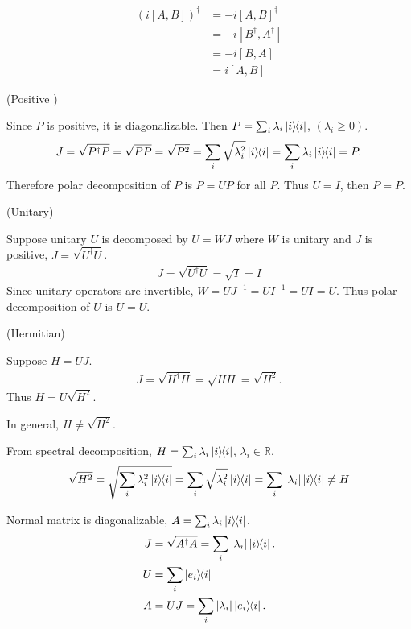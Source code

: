 \begin{align*}
	\left(i \left[A, B\right] \right)^\dagger &= -i \left[A, B\right]^\dagger\\
		&= -i \left[B^\dagger, A^\dagger \right]\\
		&= -i \left[B, A \right]\\
		&= i \left[A, B\right]
\end{align*}


(Positive )

 Since $P$ is positive, it is diagonalizable. Then $P = \sum_i \lambda_i \ket{i}\hspace{-1mm} \bra{i}$, $(\lambda_i \geq 0)$.
\begin{align*}
	J = \sqrt{P^\dagger P} = \sqrt{P P} = \sqrt{P^2} = \sum_i \sqrt{\lambda_i^2} \ket{i}\hspace{-1mm} \bra{i} = \sum_i \lambda_i \ket{i}\hspace{-1mm} \bra{i} = P.
\end{align*}
 Therefore polar decomposition of $P$ is $P = UP$ for all $P$.
 Thus $U = I$, then $P = P$.


\vspace{5mm}
(Unitary)

Suppose unitary $U$ is decomposed by $U = WJ$ where $W$ is unitary and $J$ is positive, $J = \sqrt{U^\dagger U}$.
\begin{align*}
	J = \sqrt{U^\dagger U} = \sqrt{I} = I
\end{align*}
Since unitary operators are invertible, $W = UJ^{-1} = UI^{-1} = UI = U$.
Thus polar decomposition of $U$ is $U = U$.


\vspace{5mm}
(Hermitian)

Suppose $H = UJ$.
\begin{align*}
	J = \sqrt{H^\dagger H} = \sqrt{HH} = \sqrt{H^2}.
\end{align*}
Thus $H = U\sqrt{H^2}$.

\begin{screen}
	In general, $H \neq \sqrt{H^2}$.

	From spectral decomposition, $H = \sum_i \lambda_i \ket{i}\hspace{-1mm} \bra{i}$, $\lambda_i \in \mathds{R}$.
	\begin{align*}
		 \sqrt{H^2} = \sqrt{ \sum_i \lambda_i^2 \ket{i}\hspace{-1mm} \bra{i} }
		 =
 		\sum_i
 			\sqrt{
 				\lambda_i^2
			} \ket{i}\hspace{-1mm} \bra{i}
		= \sum_i | \lambda_i | \ket{i}\hspace{-1mm} \bra{i} \neq H
	\end{align*}
\end{screen}


Normal matrix is diagonalizable, $A = \sum_i \lambda_i \ket{i}\hspace{-1mm} \bra{i}$.
\begin{align*}
	J &= \sqrt{A^\dagger A} = \sum_i | \lambda_i | \ket{i}\hspace{-1mm} \bra{i}.\\
	U &= \sum_i \ket{e_i}\hspace{-1mm} \bra{i}\\
	A &= UJ = \sum_i |\lambda_i| \ket{e_i}\hspace{-1mm} \bra{i}.
\end{align*}



